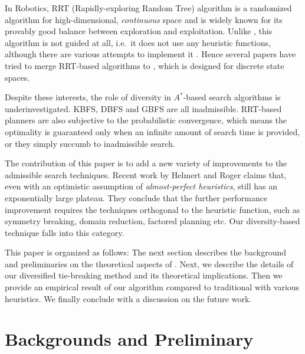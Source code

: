 In Robotics, RRT (Rapidly-exploring Random Tree) algorithm
\cite{lavalle2001randomized} is a \sota randomized algorithm for
high-dimensional, \emph{continuous} space and is widely known for its
provably good balance between exploration and exploitation. Unlike
\astar, this algorithm is not guided at all, i.e.\ it does not use any
heuristic functions, although there are various attempts to implement it
\cite{urmson2003approaches,urmson2003approaches}. Hence several papers
\cite{alcazar2011adapting,burfoot2006rrt,likhachev2008r} have tried to
merge RRT-based algorithms to \astar, which is designed for discrete
state spaces.

Despite these interests, the role of diversity in \(A^*\)-based search
algorithms is underinvestigated.
KBFS, DBFS and GBFS are all inadmissible.
RRT-based planners are also subjective to the probabilistic convergence,
which means the optimality is guaranteed only when an infinite amount of
search time is provided, or they simply succumb to inadmissible search.


The contribution of this paper is to add a new variety of improvements
to the admissible search techniques.  Recent work by Helmert and Roger
 claims that, even with an optimistic
assumption of \emph{almost-perfect heuristics}, \astar still has an
exponentially large plateau. They conclude that the further performance
improvement requires the techniques orthogonal to the heuristic
function, such as symmetry breaking, domain reduction, factored planning
etc.  Our diversity-based technique falls into this category.

This paper is organized as follows: The next section describes the
background and preliminaries on the theoretical aspects of
\astar. Next, we describe the details of our diversified tie-breaking
method and its theoretical implications.  Then we provide an empirical
result of our algorithm compared to traditional \astar with various
heuristics. We finally conclude with a discussion on the future work.

\section{Backgrounds and Preliminary}
\label{sec-1}

